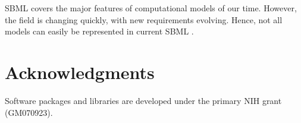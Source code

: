 SBML covers the major features of computational models of our time. 
However, the field is changing quickly, with new requirements evolving. 
Hence, not all models can easily be represented in current SBML  \cite{waltemath2016toward}. 

\section{Acknowledgments}

Software packages and libraries are developed under the primary NIH grant (GM070923).

\clearpage




